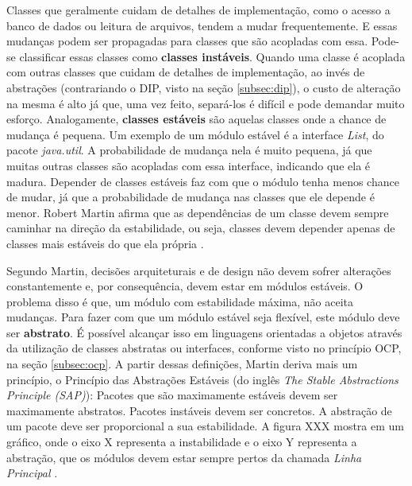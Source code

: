 Classes que geralmente cuidam de detalhes de implementação, como o acesso a
banco de dados ou leitura de arquivos, tendem a mudar frequentemente. E essas
mudanças podem ser propagadas para classes que são acopladas com essa. Pode-se
classificar essas classes como \textbf{classes instáveis}.
Quando uma classe é acoplada com outras classes que cuidam de detalhes de
implementação, ao invés de abstrações (contrariando o DIP, visto na seção
\ref{subsec:dip}), o custo de alteração na mesma é alto já que, uma vez feito,
separá-los é difícil e pode demandar muito esforço. Analogamente,
\textbf{classes estáveis} são aquelas classes onde a chance de mudança é
pequena. Um exemplo de um módulo estável é a interface \textit{List}, do pacote
\textit{java.util}. A probabilidade de mudança nela é muito pequena, já que
muitas outras classes são acopladas com essa interface, indicando que ela é
madura. Depender de classes estáveis faz com que o módulo tenha menos
chance de mudar, já que a probabilidade de mudança nas classes que ele depende
é menor. Robert Martin afirma que as dependências de um classe devem sempre
caminhar na direção da estabilidade, ou seja, classes devem depender apenas de
classes mais estáveis do que ela própria \cite{agile-ppp}.


Segundo Martin, decisões arquiteturais e de design não devem sofrer
alterações constantemente e, por consequência, devem estar em módulos estáveis.
O problema disso é que, um módulo com estabilidade máxima, não aceita mudanças.
Para fazer com que um módulo estável seja flexível, este módulo deve ser
\textbf{abstrato}. É possível alcançar isso em linguagens orientadas a objetos
através da utilização de classes abstratas ou interfaces, conforme visto no
princípio OCP, na seção \ref{subsec:ocp}. A partir dessas definições, Martin
deriva mais um princípio, o Princípio das Abstrações Estáveis (do inglês
\textit{The Stable Abstractions Principle (SAP)}): Pacotes que são maximamente
estáveis devem ser maximamente abstratos. Pacotes instáveis devem ser concretos.
A abstração de um pacote deve ser proporcional a sua estabilidade. A figura XXX
mostra em um gráfico, onde o eixo X representa a instabilidade e o eixo Y
representa a abstração, que os módulos devem estar sempre pertos da chamada
\textit{Linha Principal} \cite{agile-ppp}.



